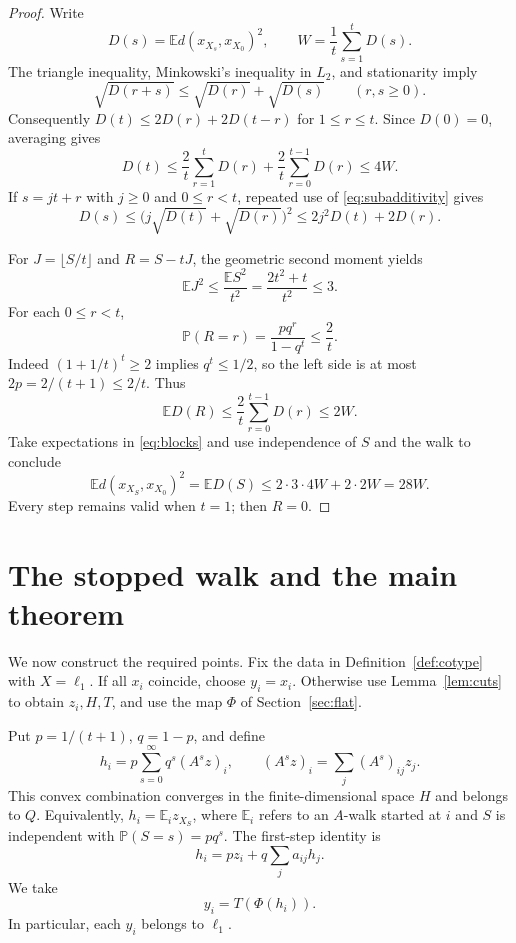 \documentclass[11pt]{article}
\theoremstyle{definition}
\theoremstyle{remark}
\numberwithin{equation}{section}
\newcommand{\E}{\mathbb E}
\newcommand{\Prob}{\mathbb P}
\begin{document}
\begin{proof}
Write
\[
 D(s)=\E d(x_{X_s},x_{X_0})^2,
 \qquad W=\frac1t\sum_{s=1}^t D(s).
\]
The triangle inequality, Minkowski's inequality in $L_2$, and
stationarity imply
\begin{equation}\label{eq:subadditivity}
 \sqrt{D(r+s)}\leq\sqrt{D(r)}+\sqrt{D(s)}
 \qquad(r,s\geq0).
\end{equation}
Consequently $D(t)\leq2D(r)+2D(t-r)$ for $1\leq r\leq t$.
Since $D(0)=0$, averaging gives
\begin{equation}\label{eq:Dt}
 D(t)\leq\frac2t\sum_{r=1}^tD(r)
          +\frac2t\sum_{r=0}^{t-1}D(r)\leq4W.
\end{equation}
If $s=jt+r$ with $j\geq0$ and $0\leq r<t$, repeated use of
\eqref{eq:subadditivity} gives
\begin{equation}\label{eq:blocks}
 D(s)\leq\bigl(j\sqrt{D(t)}+\sqrt{D(r)}\bigr)^2
        \leq2j^2D(t)+2D(r).
\end{equation}

For $J=\lfloor S/t\rfloor$ and $R=S-tJ$, the geometric
second moment yields
\[
 \E J^2\leq\frac{\E S^2}{t^2}
 =\frac{2t^2+t}{t^2}\leq3.
\]
For each $0\leq r<t$,
\[
 \Prob(R=r)=\frac{pq^r}{1-q^t}\leq\frac2t.
\]
Indeed $(1+1/t)^t\geq2$ implies $q^t\leq1/2$, so the
left side is at most $2p=2/(t+1)\leq2/t$.
Thus
\[
 \E D(R)\leq\frac2t\sum_{r=0}^{t-1}D(r)\leq2W.
\]
Take expectations in \eqref{eq:blocks} and use independence
of $S$ and the walk to conclude
\[
 \E d(x_{X_S},x_{X_0})^2=\E D(S)
 \leq2\cdot3\cdot4W+2\cdot2W=28W.
\]
Every step remains valid when $t=1$; then $R=0$.
\end{proof}

\section{The stopped walk and the main theorem}
\label{sec:proof}

We now construct the required points. Fix the data in
Definition~\ref{def:cotype} with $X=\ell_1$. If all $x_i$
coincide, choose $y_i=x_i$. Otherwise use Lemma~\ref{lem:cuts}
to obtain $z_i,H,T$, and use the map $\Phi$ of
Section~\ref{sec:flat}.

Put $p=1/(t+1)$, $q=1-p$, and define
\begin{equation}\label{eq:resolvent}
 h_i=p\sum_{s=0}^\infty q^s(A^s z)_i,
 \qquad (A^s z)_i=\sum_j(A^s)_{ij}z_j.
\end{equation}
This convex combination converges in the finite-dimensional
space $H$ and belongs to $Q$. Equivalently,
$h_i=\E_i z_{X_S}$, where $\E_i$ refers to an $A$-walk started
at $i$ and $S$ is independent with $\Prob(S=s)=pq^s$.
The first-step identity is
\begin{equation}\label{eq:harmonic}
 h_i=pz_i+q\sum_j a_{ij}h_j.
\end{equation}
We take
\begin{equation}\label{eq:y}
 y_i=T(\Phi(h_i)).
\end{equation}
In particular, each $y_i$ belongs to $\ell_1$.
\end{document}
